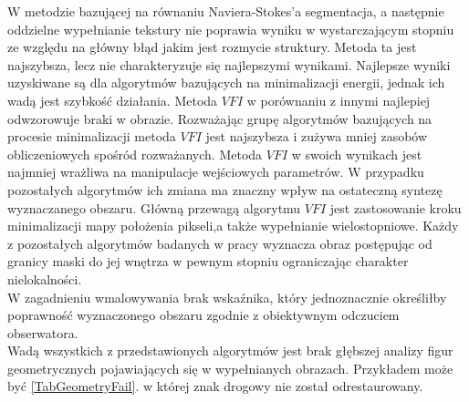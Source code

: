 \documentclass[12pt, twoside, openany]{report}
\theoremstyle{definition}
\begin{document}
W metodzie bazującej na równaniu Naviera-Stokes'a segmentacja, a następnie oddzielne wypełnianie tekstury nie poprawia wyniku w wystarczającym stopniu ze względu na główny błąd jakim jest rozmycie struktury. Metoda ta jest najszybsza, lecz nie charakteryzuje się najlepszymi wynikami. Najlepsze wyniki uzyskiwane są dla algorytmów bazujących na minimalizacji energii, jednak ich wadą jest szybkość działania. Metoda $VFI$ w porównaniu z innymi najlepiej odwzorowuje braki w obrazie. Rozważając grupę algorytmów bazujących na procesie minimalizacji metoda $VFI$ jest najszybsza i zużywa mniej zasobów obliczeniowych spośród rozważanych. Metoda $VFI$ w swoich wynikach jest najmniej wrażliwa na manipulacje wejściowych parametrów. W przypadku pozostałych algorytmów ich zmiana ma znaczny wpływ na ostateczną syntezę wyznaczanego obszaru. Główną przewagą algorytmu $VFI$ jest zastosowanie kroku  minimalizacji mapy położenia pikseli,a także wypełnianie wielostopniowe. Każdy z pozostałych algorytmów badanych w pracy wyznacza obraz postępując od granicy maski do jej wnętrza w pewnym stopniu ograniczając charakter nielokalności.\\
W zagadnieniu wmalowywania brak wskaźnika, który jednoznacznie określiłby poprawność wyznaczonego obszaru zgodnie z obiektywnym odczuciem obserwatora.
\\
Wadą wszystkich z przedstawionych algorytmów jest brak głębszej analizy figur geometrycznych pojawiających się w wypełnianych obrazach. Przykładem może być \autoref{TabGeometryFail}. w której znak drogowy nie został odrestaurowany.
\end{document}
